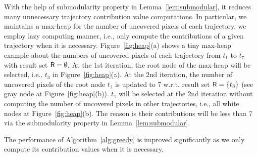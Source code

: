 With the help of submodularity property in Lemma~\ref{lem:submodular}, it reduces many unnecessary trajectory contribution value computations.
In particular, we maintains a max-heap for the number of uncovered pixels of each trajectory,
we employ lazy computing manner, i.e., only compute the contributions of a given trajectory when it is necessary.
Figure~\ref{fig:heap}(a) shows a tiny max-heap example about the numbers of uncovered pixels of each trajectory from $t_1$ to $t_7$ with result set $\mathsf{R}=\emptyset$.
At the 1st iteration, the root node of the max-heap will be selected, i.e., $t_3$ in Figure~\ref{fig:heap}(a).
At the 2nd iteration, the number of uncovered pixels of the root node $t_1$ is updated to 7 w.r.t. result set $\mathsf{R} = \{t_3 \}$ (see gray node at Figure~\ref{fig:heap}(b)).
$t_1$ will be selected at the 2nd iteration without computing the number of uncovered pixels in other trajectories, i.e., all white nodes at Figure~\ref{fig:heap}(b).
The reason is their contributions will be less than 7 via the submodularity property in Lemma~\ref{lem:submodular}.


%
%
The performance of Algorithm~\ref{alg:greedy} is improved significantly as we only compute its contribution values when it is necessary.



